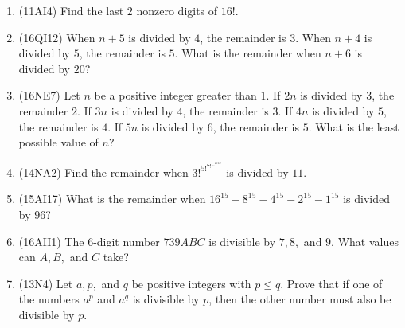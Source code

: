 \documentclass[10pt,paper=letter]{scrartcl}
\begin{document}
\begin{enumerate}

\item (11AI4) Find the last $2$ nonzero digits of $16!$.

\item (16QI12) When $n+5$ is divided by $4$, the remainder is $3$. When $n+4$ is divided by $5$, the remainder is $5$. What is the remainder when $n+6$ is divided by $20$?

\item (16NE7) Let $n$ be a positive integer greater than $1$. If $2n$ is divided by $3$, the remainder $2$. If $3n$ is divided by $4$, the remainder is $3$. If $4n$ is divided by $5$, the remainder is $4$. If $5n$ is divided by $6$, the remainder is $5$. What is the least possible value of $n$?

\item (14NA2) Find the remainder when $3!^{5!^{7!^{\ldots^{2013!}}}}$ is divided by $11$.

\item (15AI17) What is the remainder when $16^{15} - 8^{15} - 4^{15} - 2^{15} - 1^{15}$ is divided by $96$?

\item (16AII1) The $6$-digit number $739ABC$ is divisible by $7, 8,$ and $9$. What values can $A, B,$ and $C$ take?

\item (13N4) Let $a, p,$ and $q$ be positive integers with $p \leq q$. Prove that if one of the numbers $a^p$ and $a^q$ is divisible by $p$, then the other number must also be divisible by $p$.

\end{enumerate}
\end{document}
